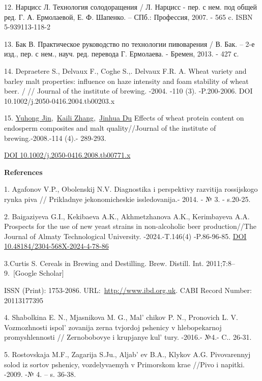 12. Нарцисс Л. Технология солодоращения / Л. Нарцисс - пер. с нем. под
общей ред. Г. А. Ермолаевой, Е. Ф. Шапенко. -- СПб.: Профессия, 2007. -
565 c. ISBN 5-939113-118-2

13. Бак В. Практическое руководство по технологии пивоварения / В. Бак.
-- 2-е изд., пер. с нем., науч. ред. перевода Г. Ермолаева. - Бремен,
2013. - 427 с.

14. Depraetere S., Delvaux F., Coghe S.,. Delvaux F.R. A. Wheat variety
and barley malt properties: influence on haze intensity and foam
stability of wheat beer. / // Journal of the institute of brewing.
-2004. -110 (3). -P.200-2006. DOI 10.1002/j.2050-0416.2004.tb00203.x

15. \href{https://onlinelibrary.wiley.com/authored-by/Jin/Yuhong}{Yuhong
Jin},~\href{https://onlinelibrary.wiley.com/authored-by/Zhang/Kaili}{Kaili
Zhang},~\href{https://onlinelibrary.wiley.com/authored-by/Du/Jinhua}{Jinhua
Du} Effects of wheat protein content on endosperm composites and malt
quality//Journal of the institute of brewing.-2008.-114 (4).- 289-293.

\href{https://doi.org/10.1002/j.2050-0416.2008.tb00771.x}{DOI
10.1002/j.2050-0416.2008.tb00771.x}

{\bfseries References}

1. Agafonov V.P., Obolenskij N.V. Diagnostika i perspektivy razvitija
rossijskogo rynka piva // Prikladnye jekonomicheskie issledovanija.-
2014. - № 3. - s.20-25.

2. Baigaziyeva G.I., Kekibaeva A.K., Akhmetzhanova A.K., Kerimbayeva
A.A. Prospects for the use of new yeast strains in non-alcoholic beer
production//The Journal of Almaty Technological University.
-2024.-T.146(4) -P.86-96-85.
\href{https://doi.org/10.48184/2304-568X-2024-4-78-86}{DOI
10.48184/2304-568X-2024-4-78-86}

3.Curtis S. Cereals in Brewing and Destilling. Brew. Distill. Int.
2011;7:8--9.~{[}Google Scholar{]}

ISSN (Print): 1753-2086.
URL:~\href{http://www.ibd.org.uk/}{http://www.ibd.org.uk}. CABI Record
Number: 20113177395

4. Shabolkina E. N., Mjasnikova M. G., Mal' chikov P. N.,
Pronovich L. V. Vozmozhnosti ispol' zovanija zerna
tvjordoj pshenicy v hlebopekarnoj promyshlennosti // Zernobobovye i
krupjanye kul' tury. -2016.- №4.- C.. 26-31.

5. Rostovskaja M.F., Zagarija S.Ju., Aljab' ev B.A.,
Klykov A.G. Pivovarennyj solod iz sortov pshenicy, vozdelyvaemyh v
Primorskom krae //Pivo i napitki. -2009. -№ 4. -- s. 36-38.


